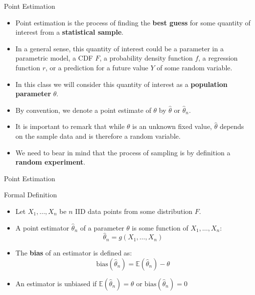 \documentclass[handout]{beamer}
\begin{document}
\begin{frame}{Point Estimation}
\scriptsize{
\begin{itemize}
 \item Point estimation is the process of finding the \textbf{best guess} for some quantity of interest from a \textbf{statistical sample}.
 \item In a general sense, this quantity of interest could be a parameter in a parametric model, a CDF $F$, a probability density function $f$, a regression function $r$, or a prediction for a future value $Y$ of some random variable.
 \item In this class we will consider this quantity of interest as a \textbf{population parameter} $\theta$. 
  \item By convention, we denote a point estimate of $\theta$ by $\hat{\theta}$ or $\hat{\theta}_n$.
 \item It is important to remark that while $\theta$ is an unknown fixed value, $\hat{\theta}$  depends on the sample data and is therefore a random variable. 
 \item We need to bear in mind that the process of sampling is by definition a \textbf{random experiment}. 
 
\end{itemize}

} 
\end{frame}

\begin{frame}{Point Estimation}


\scriptsize{
\begin{block}{Formal Definition}
\begin{itemize}
 \item Let $X_1, \dots, X_n$ be $n$ IID data points  from some distribution  $F$.
 \item A point estimator $\hat{\theta}_n$  of a parameter $\theta$ is some function of $X_1, \dots, X_n$:
 \begin{displaymath}
 \hat{\theta}_n=g(X_1, \dots, X_n) 
 \end{displaymath}
 
\end{itemize}

 
\end{block}

\begin{itemize}
 \item The \textbf{bias} of an estimator is defined as: 
\begin{displaymath}
 \text{bias}(\hat{\theta}_n)=\mathbb{E}(\hat{\theta}_n)-\theta
\end{displaymath}
\item An estimator is unbiased if $\mathbb{E}(\hat{\theta}_n)=\theta$ or  $\text{bias}(\hat{\theta}_n)=0 $
\end{itemize}

} 
\end{frame}
\end{document}
